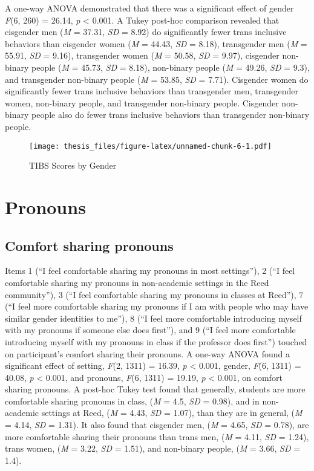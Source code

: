 \documentclass[12pt,twoside]{reedthesis}
\begin{document}
A one-way ANOVA demonstrated that there was a significant effect of gender \emph{F}(6, 260) = 26.14, \emph{p} \textless{} 0.001.
A Tukey post-hoc comparison revealed that cisgender men (\emph{M} = 37.31, \emph{SD} = 8.92) do significantly fewer trans inclusive behaviors than cisgender women (\emph{M} = 44.43, \emph{SD} = 8.18), transgender men (\emph{M} = 55.91, \emph{SD} = 9.16), transgender women (\emph{M} = 50.58, \emph{SD} = 9.97), cisgender non-binary people (\emph{M} = 45.73, \emph{SD} = 8.18), non-binary people (\emph{M} = 49.26, \emph{SD} = 9.3), and transgender non-binary people (\emph{M} = 53.85, \emph{SD} = 7.71). Cisgender women do significantly fewer trans inclusive behaviors than transgender men, transgender women, non-binary people, and transgender non-binary people. Cisgender non-binary people also do fewer trans inclusive behaviors than transgender non-binary people.
\begin{figure}
\centering
\texttt{[image: thesis\_files/figure-latex/unnamed-chunk-6-1.pdf]}
\caption{\label{fig:unnamed-chunk-6}TIBS Scores by Gender}
\end{figure}
\hypertarget{pronouns-1}{%
\section{Pronouns}\label{pronouns-1}}

\hypertarget{comfort-sharing-pronouns}{%
\subsection{Comfort sharing pronouns}\label{comfort-sharing-pronouns}}

Items 1 (``I feel comfortable sharing my pronouns in most settings''), 2 (``I feel comfortable sharing my pronouns in non-academic settings in the Reed community''), 3 (``I feel comfortable sharing my pronouns in classes at Reed''), 7 (``I feel more comfortable sharing my pronouns if I am with people who may have similar gender identities to me''), 8 (``I feel more comfortable introducing myself with my pronouns if someone else does first''), and 9 (``I feel more comfortable introducing myself with my pronouns in class if the professor does first'') touched on participant's comfort sharing their pronouns.
A one-way ANOVA found a significant effect of setting, \emph{F}(2, 1311) = 16.39, \emph{p} \textless{} 0.001, gender, \emph{F}(6, 1311) = 40.08, \emph{p} \textless{} 0.001, and pronouns, \emph{F}(6, 1311) = 19.19, \emph{p} \textless{} 0.001, on comfort sharing pronouns. A post-hoc Tukey test found that generally, students are more comfortable sharing pronouns in class, (\emph{M} = 4.5, \emph{SD} = 0.98), and in non-academic settings at Reed, (\emph{M} = 4.43, \emph{SD} = 1.07), than they are in general, (\emph{M} = 4.14, \emph{SD} = 1.31). It also found that cisgender men, (\emph{M} = 4.65, \emph{SD} = 0.78), are more comfortable sharing their pronouns than trans men, (\emph{M} = 4.11, \emph{SD} = 1.24), trans women, (\emph{M} = 3.22, \emph{SD} = 1.51), and non-binary people, (\emph{M} = 3.66, \emph{SD} = 1.4).
\end{document}
